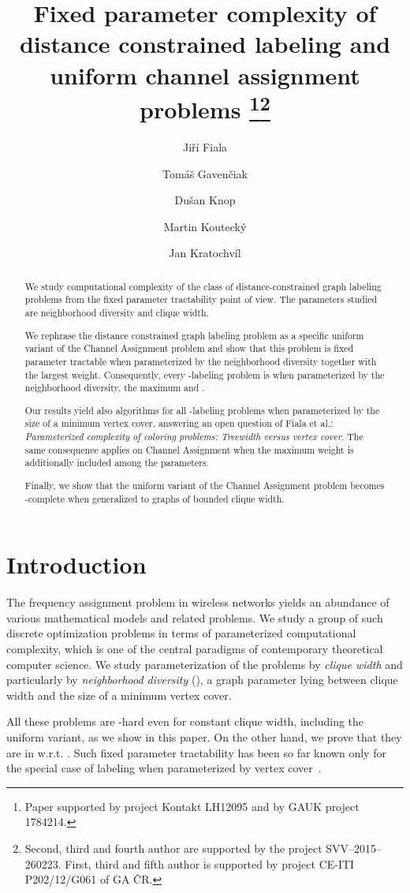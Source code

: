 \documentclass[a4paper,UKenglish]{lipics}
\title{Fixed parameter complexity of distance constrained labeling and uniform channel assignment problems
\footnote{Paper supported by project Kontakt LH12095 and by GAUK project 1784214.}\footnote{Second, third and fourth author are supported by the project SVV--2015--260223. First, third and fifth author is supported by project CE-ITI P202/12/G061 of GA ČR.}}
\author[1]{Jiří Fiala}
\author[1]{Tomáš Gavenčiak}
\author[1]{Dušan Knop}
\author[1]{Martin Koutecký}
\author[1]{Jan Kratochvíl}
\affil[1]{Department of Applied Mathematics, Charles University\\
  Malostranské nám. 25, Prague
  \texttt{\{fiala,gavento,knop,koutecky,honza\}@kam.mff.cuni.cz}
}
\newcommand{\NP}{{\sf{NP}}\xspace}
\newcommand{\FPT}{{\sf{FPT}}\xspace}
\theoremstyle{plain}
\theoremstyle{definition}
\begin{document}
\maketitle

\begin{abstract}
  We study computational complexity of the class of distance-constrained graph labeling problems
from the fixed parameter tractability point of view. The parameters studied are 
neighborhood diversity and clique width. 



We rephrase the distance constrained graph labeling problem as
a specific uniform variant of the {\sc Channel Assignment} problem and show that this problem is fixed parameter tractable when 
parameterized by the neighborhood diversity together with the largest weight.
Consequently, every {\sc -labeling} problem is \FPT{} when parameterized by
the neighborhood diversity, the maximum  and .

Our results yield also \FPT{} algorithms for all {\sc -labeling} 
problems when parameterized by the size of a minimum vertex cover, answering an open question of
Fiala et al.: \emph{Parameterized complexity of coloring problems: Treewidth versus
vertex cover}. The same consequence applies on {\sc Channel Assignment} when the maximum weight is additionally
included among the parameters.



Finally, we show that the uniform variant of the {\sc Channel Assignment} problem becomes \NP-complete when 
generalized to graphs of bounded clique width. \end{abstract}

\section{Introduction}\label{s:intro}

The frequency assignment problem in wireless networks 
yields an abundance of various mathematical models and related problems.
We study a group of such discrete optimization problems in terms of parameterized
computational complexity, which is one of the central paradigms of
contemporary theoretical computer science. We study parameterization of the problems by
\emph{clique width} and particularly by \emph{neighborhood diversity} (), 
a graph parameter lying between clique width and the size of a minimum vertex cover.

All these problems are \NP-hard even for constant clique width,
including the uniform variant, as we show in this paper. 
On the other hand, we prove that they are in \FPT{} w.r.t. . 
Such fixed parameter tractability has been so far known only for the special case of 
labeling when parameterized by vertex cover~\cite{l:FGK09}.
\end{document}
